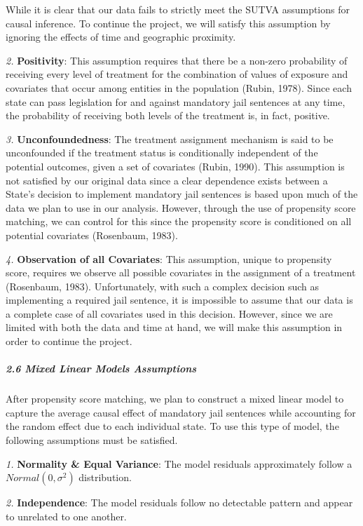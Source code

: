 \documentclass[]{article}
\let\oldsubparagraph\subparagraph
\renewcommand{\subparagraph}[1]{\oldsubparagraph{#1}\mbox{}}
\begin{document}
While it is clear that our data fails to strictly meet the SUTVA
assumptions for causal inference. To continue the project, we will
satisfy this assumption by ignoring the effects of time and geographic
proximity.

\emph{2.} \textbf{Positivity}: This assumption requires that there be a
non-zero probability of receiving every level of treatment for the
combination of values of exposure and covariates that occur among
entities in the population (Rubin, 1978). Since each state can pass
legislation for and against mandatory jail sentences at any time, the
probability of receiving both levels of the treatment is, in fact,
positive.

\emph{3.} \textbf{Unconfoundedness}: The treatment assignment mechanism
is said to be unconfounded if the treatment status is conditionally
independent of the potential outcomes, given a set of covariates (Rubin,
1990). This assumption is not satisfied by our original data since a
clear dependence exists between a State's decision to implement
mandatory jail sentences is based upon much of the data we plan to use
in our analysis. However, through the use of propensity score matching,
we can control for this since the propensity score is conditioned on all
potential covariates (Rosenbaum, 1983).

\emph{4.} \textbf{Observation of all Covariates}: This assumption,
unique to propensity score, requires we observe all possible covariates
in the assignment of a treatment (Rosenbaum, 1983). Unfortunately, with
such a complex decision such as implementing a required jail sentence,
it is impossible to assume that our data is a complete case of all
covariates used in this decision. However, since we are limited with
both the data and time at hand, we will make this assumption in order to
continue the project.

\hypertarget{mixed-linear-models-assumptions}{%
\subparagraph{2.6 Mixed Linear Models
Assumptions}\label{mixed-linear-models-assumptions}}

After propensity score matching, we plan to construct a mixed linear
model to capture the average causal effect of mandatory jail sentences
while accounting for the random effect due to each individual state. To
use this type of model, the following assumptions must be satisfied.

\emph{1.} \textbf{Normality \& Equal Variance}: The model residuals
approximately follow a \(Normal(0,\sigma^2)\) distribution.

\emph{2.} \textbf{Independence}: The model residuals follow no
detectable pattern and appear to unrelated to one another.
\end{document}
